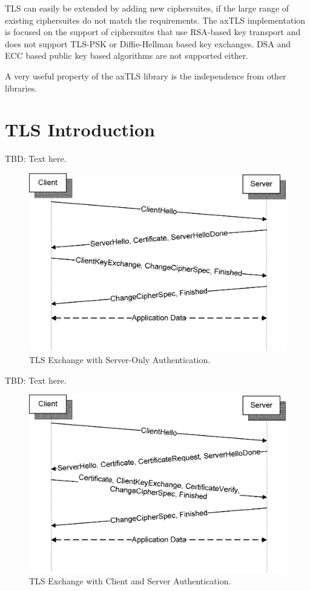 \documentclass[a4paper, 10pt]{IEEEtran}
\begin{document}
TLS can easily be extended by adding new ciphersuites, if the large range of existing ciphersuites \cite{TLS-IANA} do not match the requirements. The axTLS implementation is focused on the support of ciphersuites that use RSA-based key transport and does not support TLS-PSK or Diffie-Hellman based key exchanges. DSA and ECC based public key based algorithms are not supported either. 

A very useful property of the axTLS library is the independence from other libraries. 

\section{TLS Introduction}

TBD: Text here. 

\begin{figure}[!t]
 \centering
 \includegraphics[scale=0.50]{TLS-Main-Exchange}
 \caption{TLS Exchange with Server-Only Authentication.}
 \label{tls-main-exchange-figure}
\end{figure}

TBD: Text here. 

\begin{figure}[!t]
 \centering
 \includegraphics[scale=0.50]{TLS-Client-Authentication}
 \caption{TLS Exchange with Client and Server Authentication.}
 \label{tls-client-authentication-figure}
\end{figure}
\end{document}

